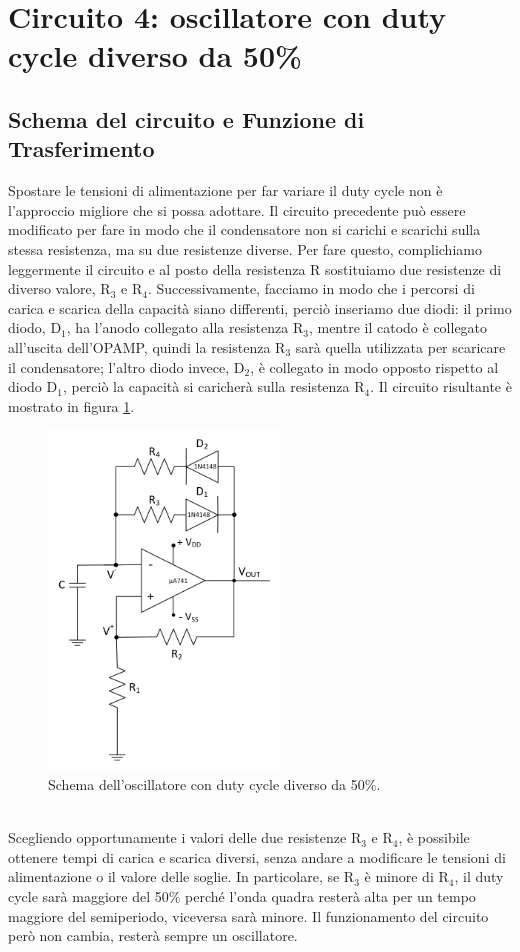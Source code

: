 \documentclass{report}
\begin{document}
\section{Circuito 4: oscillatore con duty cycle diverso da 50\%}
\subsection{Schema del circuito e Funzione di Trasferimento}
Spostare le tensioni di alimentazione per far variare il duty cycle non è l'approccio migliore che si possa adottare. Il circuito precedente può essere modificato per fare in modo che il condensatore non si carichi e scarichi sulla stessa resistenza, ma su due resistenze diverse. Per fare questo, complichiamo leggermente il circuito e al posto della resistenza $\mathrm{R}$ sostituiamo due resistenze di diverso valore, $\mathrm{R_3}$ e $\mathrm{R_4}$. Successivamente, facciamo in modo che i percorsi di carica e scarica della capacità siano differenti, perciò inseriamo due diodi: il primo diodo, $\mathrm{D_1}$, ha l'anodo collegato alla resistenza $\mathrm{R_3}$, mentre il catodo è collegato all'uscita dell'OPAMP, quindi la resistenza $\mathrm{R_3}$ sarà quella utilizzata per scaricare il condensatore; l'altro diodo invece, $\mathrm{D_2}$, è collegato in modo opposto rispetto al diodo $\mathrm{D_1}$, perciò la capacità si caricherà sulla resistenza $\mathrm{R_4}$. Il circuito risultante è mostrato in figura \ref{figura:schema4}.
\begin{figure}[h!]
	\centering
	\includegraphics[height=9cm]{immagini/schema4}
	\caption{Schema dell'oscillatore con duty cycle diverso da 50\%.}
	\label{figura:schema4}
\end{figure}
\\Scegliendo opportunamente i valori delle due resistenze $\mathrm{R_3}$ e $\mathrm{R_4}$, è possibile ottenere tempi di carica e scarica diversi, senza andare a modificare le tensioni di alimentazione o il valore delle soglie. In particolare, se $\mathrm{R_3}$ è minore di $\mathrm{R_4}$, il duty cycle sarà maggiore del 50\% perché l'onda quadra resterà alta per un tempo maggiore del semiperiodo, viceversa sarà minore.  Il funzionamento del circuito però non cambia, resterà sempre un oscillatore. 
\end{document}
